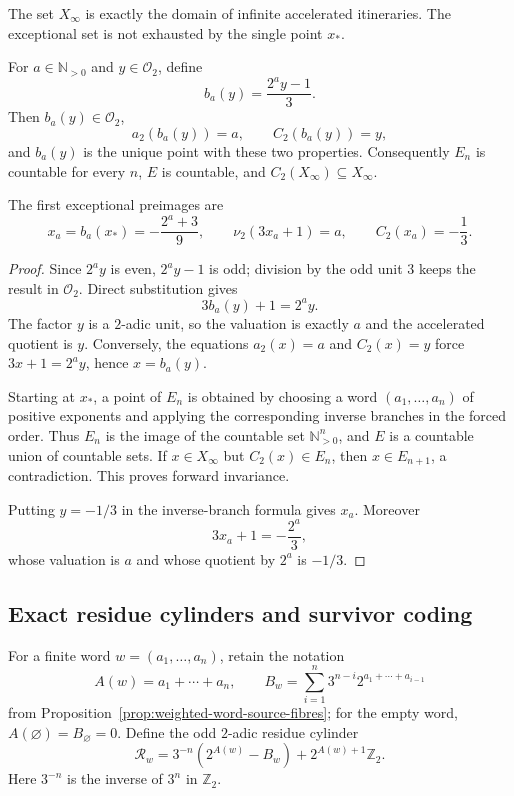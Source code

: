 The set $X_\infty$ is exactly the domain of infinite accelerated
itineraries.  The exceptional set is not exhausted by the single point
$x_*$.

\begin{proposition}
\label{prop:two-adic-exception-preimages}
For $a\in\mathbb N_{>0}$ and $y\in\mathcal O_2$, define
\[
 b_a(y)=\frac{2^a y-1}{3}.
\]
Then $b_a(y)\in\mathcal O_2$,
\[
 a_2(b_a(y))=a,
 \qquad
 C_2(b_a(y))=y,
\]
and $b_a(y)$ is the unique point with these two properties.  Consequently
$E_n$ is countable for every $n$, $E$ is countable, and
$C_2(X_\infty)\subseteq X_\infty$.

The first exceptional preimages are
\begin{equation}
\label{eq:two-adic-first-exception-preimages}
 x_a=b_a(x_*)=-\frac{2^a+3}{9},
 \qquad
 \nu_2(3x_a+1)=a,
 \qquad
 C_2(x_a)=-\frac13.
\end{equation}
\end{proposition}

\begin{proof}
Since $2^a y$ is even, $2^a y-1$ is odd; division by the odd unit $3$
keeps the result in $\mathcal O_2$.  Direct substitution gives
\[
 3b_a(y)+1=2^a y.
\]
The factor $y$ is a $2$-adic unit, so the valuation is exactly $a$ and the
accelerated quotient is $y$.  Conversely, the equations
$a_2(x)=a$ and $C_2(x)=y$ force $3x+1=2^a y$, hence $x=b_a(y)$.

Starting at $x_*$, a point of $E_n$ is obtained by choosing a word
$(a_1,\ldots,a_n)$ of positive exponents and applying the corresponding
inverse branches in the forced order.  Thus $E_n$ is the image of the
countable set $\mathbb N_{>0}^n$, and $E$ is a countable union of countable
sets.  If $x\in X_\infty$ but $C_2(x)\in E_n$, then
$x\in E_{n+1}$, a contradiction.  This proves forward invariance.

Putting $y=-1/3$ in the inverse-branch formula gives $x_a$.  Moreover
\[
 3x_a+1=-\frac{2^a}{3},
\]
whose valuation is $a$ and whose quotient by $2^a$ is $-1/3$.
\end{proof}

\subsection{Exact residue cylinders and survivor coding}

For a finite word $w=(a_1,\ldots,a_n)$, retain the notation
\[
 A(w)=a_1+\cdots+a_n,
 \qquad
 B_w=\sum_{i=1}^n3^{n-i}2^{a_1+\cdots+a_{i-1}}
\]
from Proposition~\ref{prop:weighted-word-source-fibres}; for the empty word,
$A(\varnothing)=B_\varnothing=0$.  Define the odd $2$-adic residue cylinder
\begin{equation}
\label{eq:two-adic-prefix-cylinder}
 \mathcal R_w
 =3^{-n}(2^{A(w)}-B_w)+2^{A(w)+1}\mathbb Z_2.
\end{equation}
Here $3^{-n}$ is the inverse of $3^n$ in $\mathbb Z_2$.

